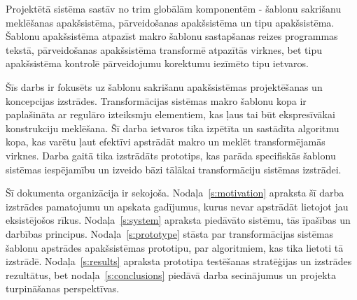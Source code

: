 Projektētā sistēma sastāv no trim globālām komponentēm - šablonu sakrišanu meklēšanas apakšsistēma, pārveidošanas apakšsistēma un tipu apakšsistēma. Šablonu apakšsistēma atpazīst makro šablonu sastapšanas reizes programmas tekstā, pārveidošanas apakšsistēma transformē atpazītās virknes, bet tipu apakšsistēma kontrolē pārveidojumu korektumu iezīmēto tipu ietvaros.

Šīs darbs ir fokusēts uz šablonu sakrišanu apakšsistēmas projektēšanas un koncepcijas izstrādes. Transformācijas sistēmas makro šablonu kopa ir paplašināta ar regulāro izteiksmju elementiem, kas ļaus tai būt ekspresīvākai konstrukciju meklēšana. Šī darba ietvaros tika izpētīta un sastādīta algoritmu kopa, kas varētu ļaut efektīvi apstrādāt makro un meklēt transformējamās virknes. Darba gaitā tika izstrādāts prototips, kas parāda specifiskās šablonu sistēmas iespējamību un izveido bāzi tālākai transformāciju sistēmas izstrādei.



Šī dokumenta organizācija ir sekojoša. Nodaļa~\ref{s:motivation} apraksta šī darba izstrādes pamatojumu un apskata gadījumus, kurus nevar apstrādāt lietojot jau eksistējošos rīkus. Nodaļa~\ref{s:system} apraksta piedāvāto sistēmu, tās īpašības un darbības principus. Nodaļa~\ref{s:prototype} stāsta par transformācijas sistēmas šablonu apstrādes apakšsistēmas prototipu, par algoritmiem, kas tika lietoti tā izstrādē. Nodaļa~\ref{s:results} apraksta prototipa testēšanas stratēģijas un izstrādes rezultātus, bet nodaļa~\ref{s:conclusions} piedāvā darba secinājumus un projekta turpināšanas perspektīvas.